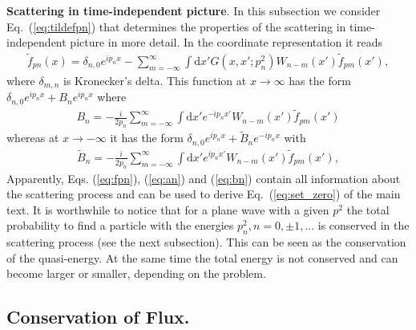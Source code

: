 {\bf Scattering in time-independent picture}. In this subsection we consider Eq.~(\ref{eq:tildefpn}) that determines the properties of the scattering in time-independent picture in more detail. In the coordinate representation it reads
\begin{align}
\tilde f_{pn}(x)=\delta_{n,0}e^{i p_n x}- \sum_{m=-\infty}^{\infty} \int\mathrm{d}x' 
 G(x,x';p_n^2)W_{n-m}(x')\tilde f_{pm}(x'),
\label{eq:fpn}
\end{align} 
where $\delta_{m,n}$ is Kronecker's delta. This function at $x\to\infty$ has the form $\delta_{n,0}e^{ip_nx}+B_ne^{ip_nx}$ where 
\begin{align}
B_n=-\frac{i}{2 p_n}\sum_{m=-\infty}^\infty \int\mathrm{d}x' e^{-i p_n x'}W_{n-m}(x')\tilde f_{pm}(x')
\label{eq:an}
\end{align}
whereas at $x\to-\infty$ it has the form $\delta_{n,0}e^{ip_nx}+\tilde B_n e^{-i p_n x}$ with
\begin{align}
\tilde B_n=-\frac{i}{2p_n}\sum_{m=-\infty}^\infty \int\mathrm{d}x' e^{i p_n x'}W_{n-m}(x')\tilde f_{pm}(x'), 
\label{eq:bn}
\end{align}
Apparently, Eqs. (\ref{eq:fpn}), (\ref{eq:an}) and (\ref{eq:bn}) contain all information about the scattering process and can be used to derive Eq.~(\ref{eq:set_zero}) of the main text. It is worthwhile to notice that for a plane wave with a given $p^2$ the total probability to find a particle with the energies $p^2_n, n=0,\pm1,...$ is conserved in the scattering process (see the next subsection). This can be seen as the conservation of the quasi-energy. At the same time the total energy is not conserved and can become larger or smaller, depending on the problem.

\subsection{Conservation of Flux.}
\label{sec:appA}

